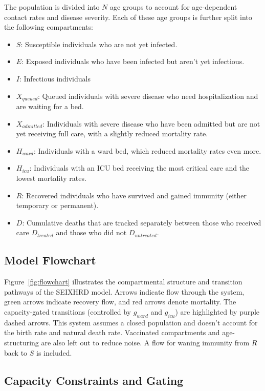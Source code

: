 \documentclass[10pt,twocolumn]{article}
\begin{document}
The population is divided into $N$ age groups to account for age-dependent contact rates and disease severity. Each of these age groups is further split into the following compartments:
\begin{itemize}
    \item $S$: Susceptible individuals who are not yet infected.
    \item $E$: Exposed individuals who have been infected but aren't yet infectious.
    \item $I$: Infectious individuals
    \item $X_{queued}$: Queued individuals with severe disease who need hospitalization and are waiting for a bed.
    \item $X_{admitted}$: Individuals with severe disease who have been admitted but are not yet receiving full care, with a slightly reduced mortality rate.
    \item $H_{ward}$: Individuals with a ward bed, which reduced mortality rates even more.
    \item $H_{icu}$: Individuals with an ICU bed receiving the most critical care and the lowest mortality rates.
    \item $R$: Recovered individuals who have survived and gained immunity (either temporary or permanent).
    \item $D$: Cumulative deaths that are tracked separately between those who received care $D_{treated}$ and those who did not $D_{untreated}$.
\end{itemize}

\subsection{Model Flowchart}

Figure~\ref{fig:flowchart} illustrates the compartmental structure and transition pathways of the SEIXHRD model.
Arrows indicate flow through the system, green arrows indicate recovery flow, and red arrows denote mortality.
The capacity-gated transitions (controlled by $g_{ward}$ and $g_{icu}$) are highlighted by purple dashed arrows.
This system assumes a closed population and doesn't account for the birth rate and natural death rate. 
Vaccinated compartments and age-structuring are also left out to reduce noise. 
A flow for waning immunity from $R$ back to $S$ is included.

\subsection{Capacity Constraints and Gating}
\end{document}
